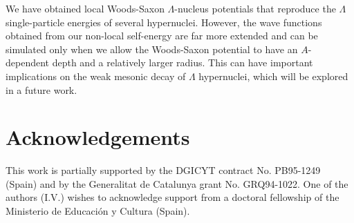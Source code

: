 We have obtained local Woods-Saxon $\Lambda$-nucleus potentials that
reproduce the $\Lambda$ single-particle energies of several hypernuclei.
However, the wave functions obtained from our non-local self-energy
are far more extended and can be simulated only when we
allow the Woods-Saxon potential  to have an $A$-dependent depth and a relatively 
larger radius. 
This can have important implications on the
weak mesonic decay of $\Lambda$ hypernuclei, which will be explored in
a future work.  

\section{Acknowledgements}
This work is partially supported by the DGICYT contract No. PB95-1249
(Spain) and by the Generalitat de Catalunya grant No. GRQ94-1022. One of
the authors (I.V.) wishes to acknowledge support from a doctoral fellowship 
of the Ministerio de Educaci\'on y Cultura (Spain).

